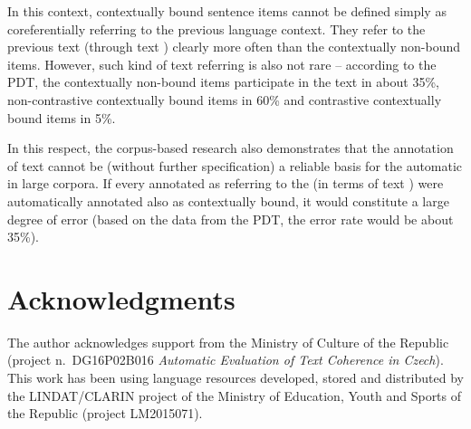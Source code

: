 \documentclass[output=paper]{langsci/langscibook.cls}
\begin{document}
In this context, contextually bound sentence items cannot be defined simply as coreferentially referring to the previous language context. They refer to the previous text (through text ) clearly more often than the contextually non-bound items. However, such kind of text referring is also not rare -- according to the PDT, the contextually non-bound items participate in the text  in about 35\%, non-contrastive contextually bound items in 60\% and contrastive contextually bound items in 5\%.




In this respect, the corpus-based research also demonstrates that the annotation of text  cannot be (without further specification) a reliable basis for the automatic  in large corpora. If every  annotated as referring to the  (in terms of text ) were automatically annotated also as contextually bound, it would constitute a large degree of error (based on the data from the PDT, the error rate would be about 35\%).



\section*{Acknowledgments\label{rysova_k:sec:Acknowledgments}}

The author acknowledges support from the Ministry of Culture of the  Republic (project n.~DG16P02B016 \textit{Automatic Evaluation of Text Coherence in Czech}). This work has been using language resources developed, stored and distributed by the LINDAT/CLARIN project of the Ministry of Education, Youth and Sports of the  Republic (project LM2015071). 

{\sloppy
\printbibliography[heading=subbibliography,notkeyword=this]
}
 
\end{document}
